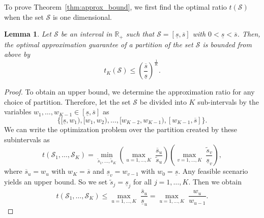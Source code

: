 \documentclass{article}
\newtheorem{lemma}[theorem]{Lemma}
\newcommand{\mS}{\mathcal{S}}
\newcommand{\newscen}[1]{\tilde{s}_{#1}}%
\begin{document}
To prove Theorem~\ref{thm:approx_bound}, we first find the optimal ratio \(t(\mS)\) when the set \(\mS\) is one dimensional. 



\begin{lemma}
	\label{lem:one_dim_approx_bound}
	Let \(\mS\) be an interval in \(\mathbb{R}_{+}\) such that \(\mS = [\underline{s}, \overline{s}]\) with \(0 < \underline{s} < \overline{s}\). 
	Then, the optimal approximation guarantee of a partition of the set \(\mS\) is bounded from above by
	\[
	t_K(\mS) \leq \left(\frac{\overline{s}}{\underline{s}}\right)^{\frac{1}{K}}.
	\]
\end{lemma}
\begin{proof}%
  To obtain an upper bound, we determine %
  the approximation ratio for any choice of partition.
Therefore, let the set \(\mS\) be divided into
\(K\) sub-intervals by the variables \(w_1,\dots,w_{K-1} \in [\underline{s}, \overline{s}]\) as
\begin{equation}
		\{[\underline{s}, w_1), [w_1, w_2), \dots, [w_{K-2}, w_{K-1}), [w_{K-1}, \overline{s}]\}.
\end{equation}
We can write the optimization problem over the partition created by these subintervals as 
\[
	t(\mS_1,\dots,\mS_K) = \min_{\newscen{1},\dots,\newscen{K}}\left(\max_{u=1,\dots,K} \;\frac{\overline{s}_u}{\newscen{u}}\right) \left(\max_{v=1,\dots,K} \;\frac{\newscen{v}}{\underline{s}_v}\right),
\]
where \(\overline{s}_u = w_u\) with \(w_K = \overline{s}\) and \(\underline{s}_v = w_{v-1}\) with \(w_0 = \underline{s}\).
Any feasible scenario yields an upper bound.
So we set \(\newscen{j} = \underline{s}_j\) for all \(j = 1,\dots, K\).
Then we obtain  
\[
	t(\mS_1,\dots,\mS_K) \leq \max_{u=1,\dots,K} \;\frac{\overline{s}_u}{\underline{s}_{u}} = \max_{u=1,\dots,K} \;\frac{w_u}{w_{u-1}}.
\]


\end{proof}
\end{document}
